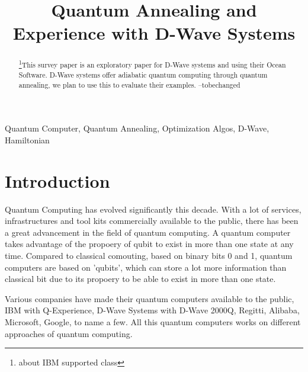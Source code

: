 \documentclass[12pt,conference]{IEEEtran}
\begin{document}
\title{Quantum Annealing and Experience with D-Wave Systems}


\author{
\and
{}
}


\maketitle

\begin{abstract}
\footnote  {about IBM supported class}This survey paper is an exploratory paper for D-Wave systems and using their Ocean Software. D-Wave systems offer adiabatic quantum computing through quantum annealing, we plan to use this to evaluate their examples. --tobechanged
\end{abstract}

\begin{IEEEkeywords}
Quantum Computer, Quantum Annealing, Optimization Algos, D-Wave, Hamiltonian
\end{IEEEkeywords}









\section{Introduction}
Quantum Computing has evolved significantly this decade. With a lot of services, infrastructures and tool kits commercially available to the public, there has been a great advancement in the field of quantum computing. A quantum computer takes advantage of the  propoery of qubit to exist in more than one state at any time. Compared to classical comouting, based on binary bits 0 and 1, quantum computers are based on 'qubits', which can store a lot more information than classical bit due to its propoery to be able to exist in more than one state. 

Various companies have made their quantum computers available to the public, IBM with Q-Experience, D-Wave Systems with D-Wave 2000Q, Regitti, Alibaba, Microsoft, Google, to name a few. All this quantum computers works on different approaches of quantum computing.
\end{document}
